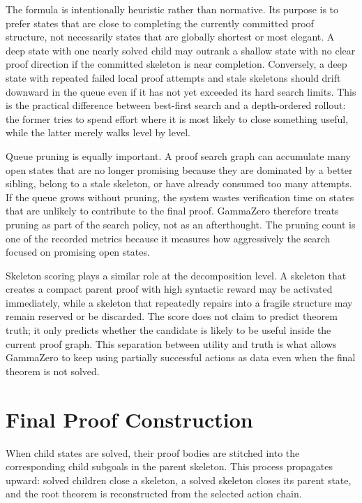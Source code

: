 \documentclass[en]{uet_awesome_thesis/uet-awesome-thesis}
\begin{document}
The formula is intentionally heuristic rather than normative. Its purpose is to prefer states that are
close to completing the currently committed proof structure, not necessarily states that are globally
shortest or most elegant. A deep state with one nearly solved child may outrank a shallow state with no
clear proof direction if the committed skeleton is near completion. Conversely, a deep state with repeated
failed local proof attempts and stale skeletons should drift downward in the queue even if it has not yet exceeded its
hard search limits. This is the practical difference between best-first search and a depth-ordered rollout:
the former tries to spend effort where it is most likely to close something useful, while the latter merely
walks level by level.

Queue pruning is equally important. A proof search graph can accumulate many open states that are no
longer promising because they are dominated by a better sibling, belong to a stale skeleton, or have
already consumed too many attempts. If the queue grows without pruning, the system wastes verification
time on states that are unlikely to contribute to the final proof. GammaZero therefore treats pruning as
part of the search policy, not as an afterthought. The pruning count is one of the recorded metrics
because it measures how aggressively the search focused on promising open states.

Skeleton scoring plays a similar role at the decomposition level. A skeleton that creates a compact parent proof with high syntactic reward may be activated immediately, while a skeleton that repeatedly repairs into a
fragile structure may remain reserved or be discarded. The score does not claim to predict theorem
truth; it only predicts whether the candidate is likely to be useful inside the current proof graph. This
separation between utility and truth is what allows GammaZero to keep using partially successful actions
as data even when the final theorem is not solved.

\section{Final Proof Construction}

When child states are solved, their proof bodies are stitched into the corresponding child subgoals in the parent skeleton. This process propagates upward: solved children close a skeleton, a solved skeleton closes its parent state, and the root theorem is reconstructed from the selected action chain.
\end{document}
